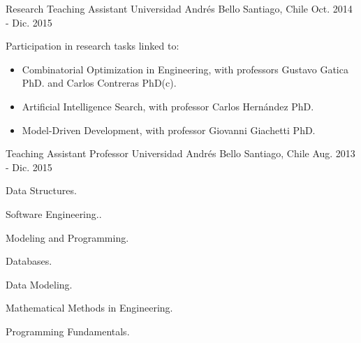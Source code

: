 \begin{cventries}
  \cventry
    {Research Teaching Assistant} %
    {Universidad Andrés Bello} %
    {Santiago, Chile} %
    {Oct. 2014 - Dic. 2015} %
    {
      \begin{cvitems} %
        \item {Participation in research tasks linked to:}
        \begin{itemize}
        	\item{Combinatorial Optimization in Engineering, with professors Gustavo Gatica PhD. and Carlos Contreras PhD(c).}
        	\item{Artificial Intelligence Search, with professor Carlos Hernández PhD.}
        	\item{Model-Driven Development, with professor Giovanni Giachetti PhD.}
      	\end{itemize}
      \end{cvitems}
    }

  \cventry
    {Teaching Assistant Professor} %
    {Universidad Andrés Bello} %
    {Santiago, Chile} %
    {Aug. 2013 - Dic. 2015} %
    {
      \begin{cvitems} %
        \item {Data Structures.}
        \item {Software Engineering.}.
        \item {Modeling and Programming.}
        \item {Databases.}
        \item {Data Modeling.}
        \item {Mathematical Methods in Engineering.}
        \item {Programming Fundamentals.}
      \end{cvitems}
    }

\end{cventries}
